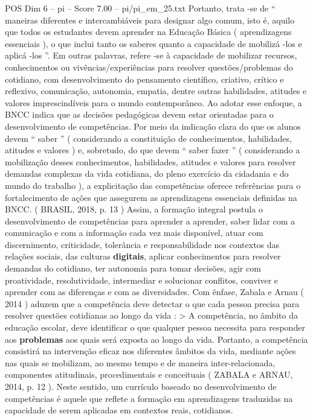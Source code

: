 \begin{textsample}{POS Dim 6 – pi – Score 7.00 – pi/pi\_em\_25.txt}
Portanto, trata -se de “ maneiras diferentes e intercambiáveis para designar algo comum, isto é, aquilo que todos os estudantes devem aprender na Educação Básica ( aprendizagens essenciais ), o que inclui tanto os saberes quanto a capacidade de mobilizá -los e aplicá -los ”.
Em outras palavras, refere -se à capacidade de mobilizar recursos, conhecimentos ou vivências/experiências para resolver questões/problemas do cotidiano, com desenvolvimento do pensamento científico, criativo, crítico e reflexivo, comunicação, autonomia, empatia, dentre outras habilidades, atitudes e valores imprescindíveis para o mundo contemporâneo.
Ao adotar esse enfoque, a BNCC indica que as decisões pedagógicas devem estar orientadas para o desenvolvimento de competências.
Por meio da indicação clara do que os alunos devem “ saber ” ( considerando a constituição de conhecimentos, habilidades, atitudes e valores ) e, sobretudo, do que devem “ saber fazer ” ( considerando a mobilização desses conhecimentos, habilidades, atitudes e valores para resolver demandas complexas da vida cotidiana, do pleno exercício da cidadania e do mundo do trabalho ), a explicitação das competências oferece referências para o fortalecimento de ações que assegurem as aprendizagens essenciais definidas na BNCC. ( BRASIL, 2018, p. 13 ) Assim, a formação integral postula o desenvolvimento de competências para aprender a aprender, saber lidar com a comunicação e com a informação cada vez mais disponível, atuar com discernimento, criticidade, tolerância e responsabilidade nos contextos das relações sociais, das culturas \textbf{digitais}, aplicar conhecimentos para resolver demandas do cotidiano, ter autonomia para tomar decisões, agir com proatividade, resolutividade, intermediar e solucionar conflitos, conviver e aprender com as diferenças e com as diversidades.
Com ênfase, Zabala e Arnau ( 2014 ) aduzem que a competência deve detectar o que cada pessoa precisa para resolver questões cotidianas ao longo da vida : > A competência, no âmbito da educação escolar, deve identificar o que qualquer pessoa necessita para responder aos \textbf{problemas} aos quais será exposta ao longo da vida.
Portanto, a competência consistirá na intervenção eficaz nos diferentes âmbitos da vida, mediante ações nas quais se mobilizam, ao mesmo tempo e de maneira inter-relacionada, componentes atitudinais, procedimentais e conceituais ( ZABALA e ARNAU, 2014, p. 12 ).
Neste sentido, um currículo baseado no desenvolvimento de competências é aquele que reflete a formação em aprendizagens traduzidas na capacidade de serem aplicadas em contextos reais, cotidianos.

\end{textsample}
